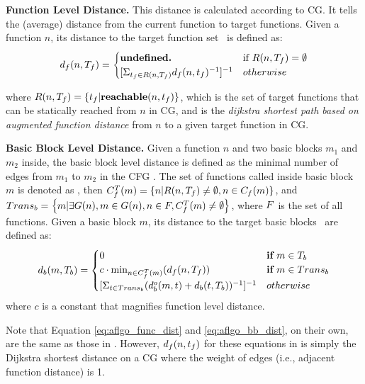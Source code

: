 \textbf{Function Level Distance.} This distance is calculated according to CG. It tells the (average) distance from the current function to target functions. Given a function $n$, its distance to the target function set \tgtfnset~is defined as:
\begin{equation}
d_f(n, \tgtfnset) =
\begin{cases}
\textbf{undefined.} & \text{if}~R(n, \tgtfnset)=\emptyset \\
[\Sigma_{\tgtfn\in R(n, \tgtfnset)} \traceFnDist{n}{\tgtfn}^{-1}]^{-1} & otherwise \\
\end{cases}
\label{eq:aflgo_func_dist}
\end{equation}

where $R(n, T_f) = \left\{t_f | \textbf{reachable}(n, t_f)\right\}$,
which is the set of target functions that can be statically reached from $n$ in CG, and  is the \emph{dijkstra shortest path based on augmented function distance} from $n$ to a given target function {\tgtfn} in CG.

\textbf{Basic Block Level Distance.} Given a function $n$ and two basic blocks $m_1$ and $m_2$ inside, the basic block level distance  is defined as the minimal number of edges from $m_1$ to $m_2$ in the CFG .
The set of functions called inside basic block $m$ is denoted as ,
then $C_f^T(m)=\left\{n | R(n, T_f)\neq\emptyset, n\in C_f(m) \right\}$, 
and $Trans_b=\left\{m| \exists G(n), m\in G(n), n\in F, C_f^T(m)\neq\emptyset \right\}$, where $F$ is the set of all functions.
Given a basic block $m$, its distance to the target basic blocks \tgtbbset~are defined as:
\begin{equation}
d_b(m, T_b) = 
\begin{cases}
0 & \textbf{if}~m\in T_b \\
c\cdot \text{min}_{n\in C_f^T(m)}(d_f(n,T_f))& \textbf{if}~m\in Trans_b\\
\Large[\Sigma_{t\in Trans_b}\large(d_b^o(m,t) + d_b(t, T_b)\large)^{-1}\Large]^{-1} & otherwise
\end{cases}
\label{eq:aflgo_bb_dist}
\end{equation}
where $c$ is a constant that magnifies function level distance.

Note that Equation \ref{eq:aflgo_func_dist} and \ref{eq:aflgo_bb_dist}, on their own, are the same as those in \aflgo \cite{Bohme:2017:DGF}. However, $d_f(n,t_f)$ for these equations in \aflgo is simply the Dijkstra shortest distance on a CG where the weight of edges (i.e., adjacent function distance) is 1.

